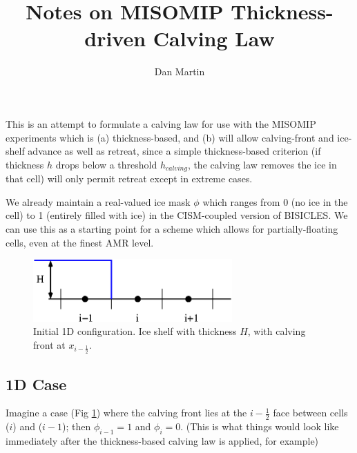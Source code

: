 \documentclass[12pt]{article}
\title{Notes on MISOMIP Thickness-driven Calving Law}
\author{Dan Martin}
\newcommand{\half}{\frac{1}{2}}
\begin{document}
\maketitle

This is an attempt to formulate a calving law for use with the MISOMIP experiments which is (a) thickness-based, and (b) will allow calving-front and ice-shelf advance as well as retreat, since a simple thickness-based criterion (if thickness $h$ drops below a threshold $h_{calving}$, the calving law removes the ice in that cell) will only permit retreat except in extreme cases.

We already maintain a real-valued ice mask $\phi$ which ranges from 0 (no ice in the cell) to 1 (entirely filled with ice) in the CISM-coupled version of BISICLES. We can use this as a starting point for a scheme which allows for partially-floating cells, even at the finest AMR level. 

\begin{figure}
\centerline{
\includegraphics[width=3.0in]{calving1}  
}
\caption{Initial 1D configuration. Ice shelf with thickness $H$, with calving front at $x_{i-\half}$.}
\label{fig:initialCond}
\end{figure}

\subsection*{1D Case}
Imagine a case (Fig \ref{fig:initialCond}) where the calving front lies at the $i-\half$ face between cells ($i$) and ($i-1$); then $\phi_{i-1} = 1$ and $\phi_i=0$. (This is what things would look like immediately after the thickness-based calving law is applied, for example)
\end{document}
